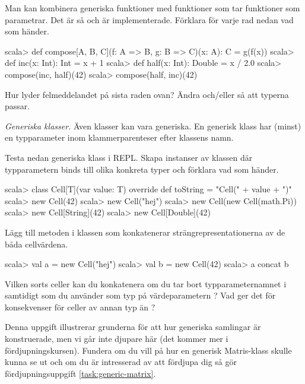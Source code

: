 \Subtask Man kan kombinera generiska funktioner med funktioner som tar funktioner som parametrar. Det är så  och  är implementerade. Förklara för varje rad nedan vad som händer.

\begin{REPL}
scala> def compose[A, B, C](f: A => B, g: B => C)(x: A): C = g(f(x))
scala> def inc(x: Int): Int = x + 1
scala> def half(x: Int): Double = x / 2.0
scala> compose(inc, half)(42)
scala> compose(half, inc)(42)
\end{REPL}

\Subtask Hur lyder felmeddelandet på sista raden ovan? Ändra  och/eller  så att typerna passar.


\Task \emph{Generiska klasser.} Även klasser kan vara generiska. En generisk klass har (minst) en typparameter inom klammerparenteser efter klassens namn.

\Subtask Testa nedan generiska klass  i REPL. Skapa instanser av klassen  där typparametern  binds till olika konkreta typer och förklara vad som händer.

\begin{REPL}
scala> class Cell[T](var value: T){
         override def toString = "Cell(" + value + ")"
       }
scala> new Cell(42)
scala> new Cell("hej")
scala> new Cell(new Cell(math.Pi))
scala> new Cell[String](42)
scala> new Cell[Double](42)
\end{REPL}

\Subtask Lägg till metoden  i klassen  som konkatenerar strängrepresentationerna av de båda cellvärdena.

\begin{REPL}
scala> val a = new Cell("hej")
scala> val b = new Cell(42)
scala> a concat b
\end{REPL}



\Subtask\Pen Vilken sorts celler kan du konkatenera om du tar bort typparameternamnet  i  samtidigt som du använder  som typ på värdeparametern ? Vad ger det för konsekvenser för celler av annan typ än ?

\Subtask\Pen Denna uppgift illustrerar grunderna för att hur generiska samlingar är konstruerade, men vi går inte djupare här (det kommer mer i fördjupningskursen). Fundera om du vill på hur en generisk Matris-klass skulle kunna se ut och om du är intresserad av att fördjupa dig så gör fördjupningsuppgift \ref{task:generic-matrix}.





